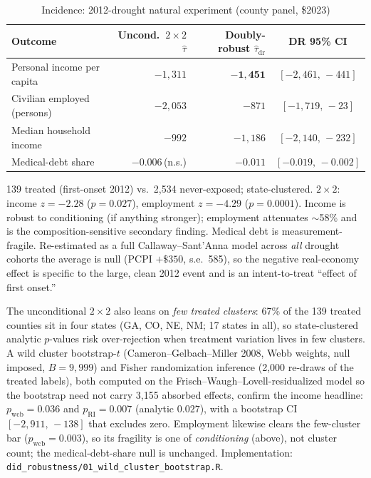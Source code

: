 \documentclass[11pt]{article}
\begin{document}
\begin{table}[h]
\centering
\caption{Incidence: 2012-drought natural experiment (county panel, \$2023)}
\label{tab:incidence}
\small
\begin{tabular}{lrrc}
\toprule
Outcome & Uncond.\ $2\times2$ $\hat\tau$ & Doubly-robust $\hat\tau_{\mathrm{dr}}$ & DR 95\% CI \\
\midrule
Personal income per capita & $-1{,}311$ & $\mathbf{-1{,}451}$ & $[-2{,}461,\,-441]$ \\
Civilian employed (persons) & $-2{,}053$ & $-871$ & $[-1{,}719,\,-23]$ \\
Median household income & $-992$ & $-1{,}186$ & $[-2{,}140,\,-232]$ \\
Medical-debt share & $-0.006$\,(n.s.) & $-0.011$ & $[-0.019,\,-0.002]$ \\
\bottomrule
\end{tabular}

\vspace{2pt}
\footnotesize\raggedright
139 treated (first-onset 2012) vs.\ 2{,}534 never-exposed; state-clustered.
$2\times2$: income $z=-2.28$ ($p=0.027$), employment $z=-4.29$ ($p=0.0001$).
Income is robust to conditioning (if anything stronger); employment attenuates
$\sim$58\% and is the composition-sensitive secondary finding. Medical debt is
measurement-fragile. Re-estimated as a full Callaway--Sant'Anna model across
\emph{all} drought cohorts the average is null (PCPI $+\$350$, s.e.\ 585), so the
negative real-economy effect is specific to the large, clean 2012 event and is an
intent-to-treat ``effect of first onset.''
\end{table}

The unconditional $2\times2$ also leans on \emph{few treated clusters}: 67\% of the 139
treated counties sit in four states (GA, CO, NE, NM; 17 states in all), so state-clustered
analytic $p$-values risk over-rejection when treatment variation lives in few clusters. A
wild cluster bootstrap-$t$ (Cameron--Gelbach--Miller 2008, Webb weights, null imposed,
$B=9{,}999$) and Fisher randomization inference (2{,}000 re-draws of the treated labels),
both computed on the Frisch--Waugh--Lovell-residualized model so the bootstrap need not
carry 3{,}155 absorbed effects, confirm the income headline: $p_{\mathrm{wcb}}=0.036$ and
$p_{\mathrm{RI}}=0.007$ (analytic $0.027$), with a bootstrap CI $[-2{,}911,\,-138]$ that
excludes zero. Employment likewise clears the few-cluster bar ($p_{\mathrm{wcb}}=0.003$),
so its fragility is one of \emph{conditioning} (above), not cluster count; the
medical-debt-share null is unchanged. Implementation:
\texttt{did\_robustness/01\_wild\_cluster\_bootstrap.R}.
\end{document}
